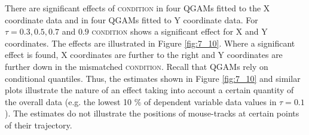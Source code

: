 There are significant effects of \textsc{condition} in four QGAMs fitted to the X coordinate data and in four QGAMs fitted to Y coordinate data. For $\tau=0.3,0.5,0.7$ and $0.9$ \textsc{condition} shows a significant effect for X and Y coordinates. The effects are illustrated in Figure \ref{fig:7_10}. Where a significant effect is found, X coordinates are further to the right and Y coordinates are further down in the mismatched \textsc{condition}. Recall that QGAMs rely on conditional quantiles. Thus, the estimates shown in Figure \ref{fig:7_10} and similar plots illustrate the nature of an effect taking into account a certain quantity of the overall data (e.g. the lowest 10 \% of dependent variable data values in $\tau=0.1$). The estimates do not illustrate the positions of mouse-tracks at certain points of their trajectory.

